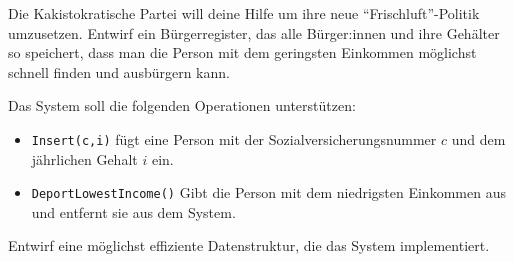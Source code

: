 \documentclass{uebung_cs}
\begin{document}
\begin{aufgabe}
	Die Kakistokratische Partei will deine Hilfe um ihre neue \enquote{Frischluft}-Politik umzusetzen.
	Entwirf ein Bürgerregister, das alle Bürger:innen und ihre Gehälter so speichert, dass man die Person mit dem geringsten Einkommen möglichst schnell finden und ausbürgern kann.

	Das System soll die folgenden Operationen unterstützen:
	\begin{itemize}
		\item \texttt{Insert(c,i)} fügt eine Person mit der Sozialversicherungsnummer $c$ und dem jährlichen Gehalt $i$ ein.
		\item \texttt{DeportLowestIncome()} Gibt die Person mit dem niedrigsten Einkommen aus und entfernt sie aus dem System.
	\end{itemize}
	Entwirf eine möglichst effiziente Datenstruktur, die das System implementiert.
\end{aufgabe}
\end{document}
